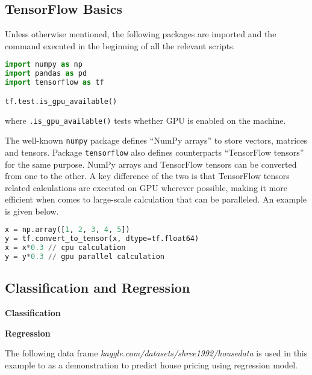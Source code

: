\subsection{TensorFlow Basics}

Unless otherwise mentioned, the following packages are imported and the command executed in the beginning of all the relevant scripts.
\begin{lstlisting}[language=Python]
import numpy as np
import pandas as pd
import tensorflow as tf

tf.test.is_gpu_available()
\end{lstlisting}
where \verb|.is_gpu_available()| tests whether GPU is enabled on the machine.

The well-known \verb|numpy| package defines ``NumPy arrays'' to store vectors, matrices and tensors. Package \verb|tensorflow| also defines counterparts ``TensorFlow tensors'' for the same purpose. NumPy arrays and TensorFlow tensors can be converted from one to the other. A key difference of the two is that TensorFlow tensors related calculations are executed on GPU wherever possible, making it more efficient when comes to large-scale calculation that can be paralleled. An example is given below.
\begin{lstlisting}[language=Python]
x = np.array([1, 2, 3, 4, 5])
y = tf.convert_to_tensor(x, dtype=tf.float64)
x = x*0.3 // cpu calculation
y = y*0.3 // gpu parallel calculation
\end{lstlisting}

\subsection{Classification and Regression}

\vspace{0.1in}
\noindent \textbf{Classification}
\vspace{0.1in}



\vspace{0.1in}
\noindent \textbf{Regression}
\vspace{0.1in}

The following data frame \textit{kaggle.com/datasets/shree1992/housedata} is used in this example to as a demonstration to predict house pricing using regression model.

